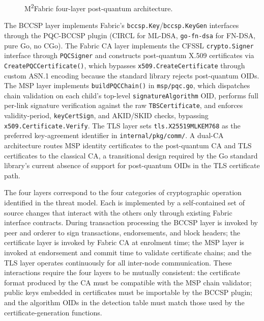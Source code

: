 \documentclass{ieeetj}
\begin{document}
\begin{figure}[ht]
\centering

\caption{M\textsuperscript{2}Fabric four-layer post-quantum architecture.}
\label{fig:m2fabric_architecture}
\end{figure}

The BCCSP layer implements Fabric's \texttt{bccsp.Key}/\texttt{bccsp.KeyGen}
interfaces through the PQC-BCCSP plugin (CIRCL for ML-DSA, \texttt{go-fn-dsa}
for FN-DSA, pure Go, no CGo). The Fabric CA layer implements the CFSSL
\texttt{crypto.Signer} interface through \texttt{PQCSigner} and constructs
post-quantum X.509 certificates via \texttt{CreatePQCCertificate()}, which
bypasses \texttt{x509.CreateCertificate} through custom ASN.1 encoding because
the standard library rejects post-quantum OIDs. The MSP layer implements
\texttt{buildPQCChain()} in \texttt{msp/pqc.go}, which dispatches chain
validation on each child's top-level \texttt{signatureAlgorithm} OID, performs
full per-link signature verification against the raw \texttt{TBSCertificate},
and enforces validity-period, \texttt{keyCertSign}, and AKID/SKID checks,
bypassing \texttt{x509.Certificate.Verify}. The TLS layer sets
\texttt{tls.X25519MLKEM768} as the preferred key-agreement identifier in
\texttt{internal/pkg/comm/}. A dual-CA architecture routes MSP identity
certificates to the post-quantum CA and TLS certificates to the classical CA, a
transitional design required by the Go standard library's current absence of
support for post-quantum OIDs in the TLS certificate path.

The four layers correspond to the four categories of cryptographic operation
identified in the threat model. Each is implemented by a self-contained set of
source changes that interact with the others only through existing Fabric
interface contracts. During transaction processing the BCCSP layer is invoked by
peer and orderer to sign transactions, endorsements, and block headers; the
certificate layer is invoked by Fabric CA at enrolment time; the MSP layer is
invoked at endorsement and commit time to validate certificate chains; and the
TLS layer operates continuously for all inter-node communication. These
interactions require the four layers to be mutually consistent: the certificate
format produced by the CA must be compatible with the MSP chain validator;
public keys embedded in certificates must be importable by the BCCSP plugin; and
the algorithm OIDs in the detection table must match those used by the
certificate-generation functions.
\end{document}
